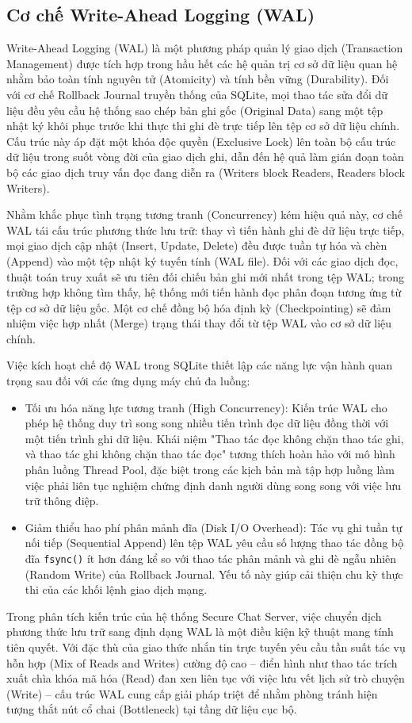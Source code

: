 \subsection{Cơ chế Write-Ahead Logging (WAL)}

Write-Ahead Logging (WAL) là một phương pháp quản lý giao dịch (Transaction Management) được tích hợp trong hầu hết các hệ quản trị cơ sở dữ liệu quan hệ nhằm bảo toàn tính nguyên tử (Atomicity) và tính bền vững (Durability). Đối với cơ chế Rollback Journal truyền thống của SQLite, mọi thao tác sửa đổi dữ liệu đều yêu cầu hệ thống sao chép bản ghi gốc (Original Data) sang một tệp nhật ký khôi phục trước khi thực thi ghi đè trực tiếp lên tệp cơ sở dữ liệu chính. Cấu trúc này áp đặt một khóa độc quyền (Exclusive Lock) lên toàn bộ cấu trúc dữ liệu trong suốt vòng đời của giao dịch ghi, dẫn đến hệ quả làm gián đoạn toàn bộ các giao dịch truy vấn đọc đang diễn ra (Writers block Readers, Readers block Writers).

Nhằm khắc phục tình trạng tương tranh (Concurrency) kém hiệu quả này, cơ chế WAL tái cấu trúc phương thức lưu trữ: thay vì tiến hành ghi đè dữ liệu trực tiếp, mọi giao dịch cập nhật (Insert, Update, Delete) đều được tuần tự hóa và chèn (Append) vào một tệp nhật ký tuyến tính (WAL file). Đối với các giao dịch đọc, thuật toán truy xuất sẽ ưu tiên đối chiếu bản ghi mới nhất trong tệp WAL; trong trường hợp không tìm thấy, hệ thống mới tiến hành đọc phân đoạn tương ứng từ tệp cơ sở dữ liệu gốc. Một cơ chế đồng bộ hóa định kỳ (Checkpointing) sẽ đảm nhiệm việc hợp nhất (Merge) trạng thái thay đổi từ tệp WAL vào cơ sở dữ liệu chính.

Việc kích hoạt chế độ WAL trong SQLite thiết lập các năng lực vận hành quan trọng sau đối với các ứng dụng máy chủ đa luồng:
\begin{itemize}[label={-}]
    \item Tối ưu hóa năng lực tương tranh (High Concurrency): Kiến trúc WAL cho phép hệ thống duy trì song song nhiều tiến trình đọc dữ liệu đồng thời với một tiến trình ghi dữ liệu. Khái niệm "Thao tác đọc không chặn thao tác ghi, và thao tác ghi không chặn thao tác đọc" tương thích hoàn hảo với mô hình phân luồng Thread Pool, đặc biệt trong các kịch bản mà tập hợp luồng làm việc phải liên tục nghiệm chứng định danh người dùng song song với việc lưu trữ thông điệp.
    \item Giảm thiểu hao phí phân mảnh đĩa (Disk I/O Overhead): Tác vụ ghi tuần tự nối tiếp (Sequential Append) lên tệp WAL yêu cầu số lượng thao tác đồng bộ đĩa \texttt{fsync()} ít hơn đáng kể so với thao tác phân mảnh và ghi đè ngẫu nhiên (Random Write) của Rollback Journal. Yếu tố này giúp cải thiện chu kỳ thực thi của các khối lệnh giao dịch mạng.
\end{itemize}

Trong phân tích kiến trúc của hệ thống Secure Chat Server, việc chuyển dịch phương thức lưu trữ sang định dạng WAL là một điều kiện kỹ thuật mang tính tiên quyết. Với đặc thù của giao thức nhắn tin trực tuyến yêu cầu tần suất tác vụ hỗn hợp (Mix of Reads and Writes) cường độ cao – điển hình như thao tác trích xuất chìa khóa mã hóa (Read) đan xen liên tục với việc lưu vết lịch sử trò chuyện (Write) – cấu trúc WAL cung cấp giải pháp triệt để nhằm phòng tránh hiện tượng thắt nút cổ chai (Bottleneck) tại tầng dữ liệu cục bộ.
